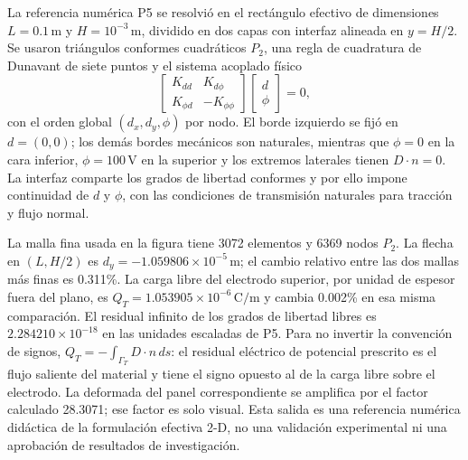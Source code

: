 La referencia numérica P5 se resolvió en el rectángulo efectivo
de dimensiones \(L=0.1\,\mathrm{m}\) y \(H=10^{-3}\,\mathrm{m}\), dividido en
dos capas con interfaz alineada en \(y=H/2\). Se usaron triángulos
conformes cuadráticos \(P_2\), una regla de cuadratura de Dunavant de siete
puntos y el sistema acoplado físico
\[
\begin{bmatrix}K_{dd}&K_{d\phi}\\K_{\phi d}&-K_{\phi\phi}\end{bmatrix}
\begin{bmatrix}d\\\phi\end{bmatrix}=0,
\]
con el orden global \((d_x,d_y,\phi)\) por nodo. El borde izquierdo se fijó
en \(d=(0,0)\); los demás bordes mecánicos son naturales, mientras que
\(\phi=0\) en la cara inferior, \(\phi=100\,\mathrm{V}\) en la superior y los
extremos laterales tienen \(D\!\cdot n=0\). La interfaz comparte los grados
de libertad conformes y por ello impone continuidad de \(d\) y \(\phi\), con
las condiciones de transmisión naturales para tracción y flujo normal.

La malla fina usada en la figura tiene 3072 elementos y 6369 nodos \(P_2\).
La flecha en \((L,H/2)\) es
\(d_y=-1.059806\times10^{-5}\,\mathrm{m}\); el cambio relativo entre las dos mallas más finas es
0.311\%. La carga libre del electrodo superior, por unidad de espesor
fuera del plano, es
\(Q_T=1.053905\times10^{-6}\,\mathrm{C/m}\) y cambia
0.002\% en esa misma comparación. El residual infinito de los grados
de libertad libres es
\(2.284210\times10^{-18}\) en las unidades escaladas de P5. Para no invertir la convención
de signos, \(Q_T=-\int_{\Gamma_T}D\!\cdot n\,ds\): el residual eléctrico
de potencial prescrito es el flujo saliente del material y tiene el signo
opuesto al de la carga libre sobre el electrodo. La deformada del panel
correspondiente se amplifica por el factor calculado
28.3071; ese factor es solo visual. Esta salida es una referencia
numérica didáctica de la formulación efectiva 2-D, no una validación
experimental ni una aprobación de resultados de investigación.
